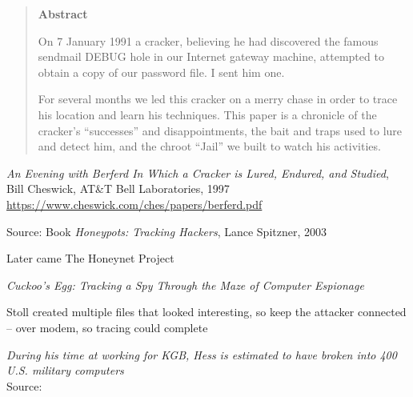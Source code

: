 \documentclass[Screen16to9,17pt]{foils}
\begin{document}




\begin{quote}
\centerline{\bf Abstract}

On 7 January 1991 a cracker, believing he had discovered the famous sendmail DEBUG hole in our Internet gateway machine, attempted to obtain a copy of our password file. I sent him one.

For several months we led this cracker on a merry chase in order to trace his location and learn his techniques. This paper is a chronicle of the cracker’s “successes” and disappointments, the bait and traps used to lure and detect him, and the chroot “Jail” we built to watch his activities.
\end{quote}

\emph{An Evening with Berferd
In Which a Cracker is Lured, Endured, and Studied}, Bill Cheswick, AT\&T Bell Laboratories, 1997
\url{https://www.cheswick.com/ches/papers/berferd.pdf}


Source: Book \emph{Honeypots: Tracking Hackers}, Lance Spitzner, 2003
\begin{list1}

\item Later came The Honeynet Project 
\end{list1}


\begin{list1}
\item
\emph{Cuckoo's Egg: Tracking a Spy Through the Maze of Computer
 Espionage}
 \item  Stoll created multiple files that looked interesting, so keep the attacker connected -- over modem, so tracing could complete
\item \emph{During his time at working for KGB, Hess is estimated to have broken into 400 U.S. military computers}\\
Source: 
\end{list1}


\end{document}

